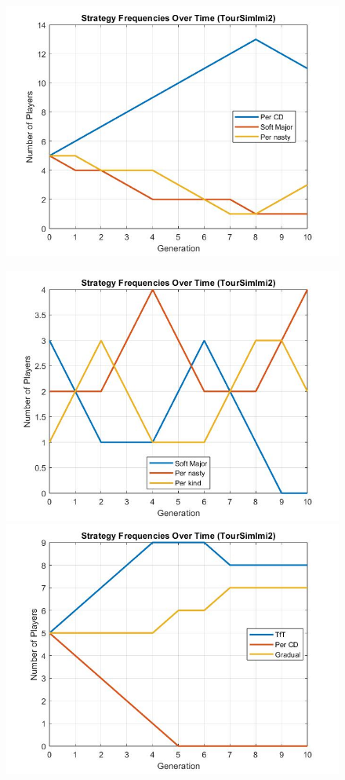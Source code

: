 \clearpage
\begin{figure}
	\centering
	\begin{minipage}{0.48\textwidth}
		\centering
		\includegraphics[width=0.7\linewidth]{toursimimi11.jpg}
	
		\label{fig:toursimimi11}
		
	\end{minipage}
		\begin{minipage}{0.48\textwidth}
			\includegraphics[width=0.7\linewidth]{toursimimi33}
			
		\end{minipage}
	
		\begin{minipage}{0.48\textwidth}
			\centering
		\includegraphics[width=0.7\linewidth]{toursimimi222}
	

\end{minipage}
\end{figure}
